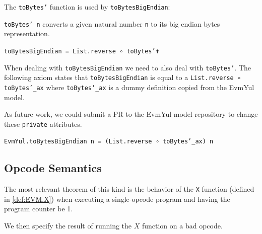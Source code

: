 The \texttt{toBytes'} function is used by \texttt{toBytesBigEndian}:

\begin{definition}[toBytesBigEndian]
\label{def:toBytesBigEndian}\leanok
\texttt{toBytes' n} converts a given natural number \texttt{n} to its big
endian bytes representation.

\texttt{toBytesBigEndian = List.reverse ∘ toBytes'✝}
\end{definition}

When dealing with \texttt{toBytesBigEndian} we need to also deal with
\texttt{toBytes'}. The following axiom states that \texttt{toBytesBigEndian} is
equal to a \texttt{List.reverse ∘ toBytes'_ax} where \texttt{toBytes'_ax} is a
dummy definition copied from the EvmYul model.

As future work, we could submit a PR to the EvmYul model repository to change
these \texttt{private} attributes.

\begin{theorem}
\label{thm:toBytesBigEndian_rw}
\texttt{EvmYul.toBytesBigEndian n = (List.reverse ∘ toBytes'_ax) n}
\end{theorem}

\subsection{Opcode Semantics}

The most relevant theorem of this kind is the behavior of the \texttt{X}
function (defined in \ref{def:EVM.X}) when executing a single-opcode program and
having the program counter be 1.


We then specify the result of running the $X$ function on a bad opcode.


